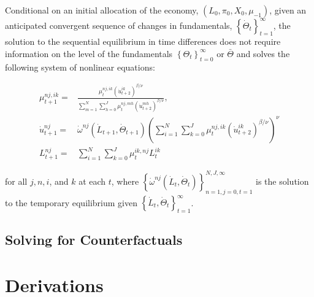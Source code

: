 \documentclass[10pt]{article}
\begin{document}
\begin{proposition} 
    Conditional on an initial allocation of the economy, 
    $\left(L_0, \pi_0, X_0, \mu_{-1}\right)$, given an anticipated 
    convergent sequence of changes in fundamentals, 
    $\left\{\dot{\Theta}_t\right\}_{t=1}^{\infty}$, the solution to the 
    sequential equilibrium in time differences does not require 
    information on the level of the fundamentals 
    $\left\{\Theta_t\right\}_{t=0}^{\infty}$ or $\bar{\Theta}$ and solves 
    the following system of nonlinear equations: 

    \begin{align}
        \mu_{t+1}^{n j, i k}=&\frac{\mu_t^{n j, i k}\left(\dot{u}_{t+2}^{i k}\right)^{\beta / \nu}}{\sum_{m=1}^N \sum_{h=0}^J \mu_t^{n j, m h}\left(\dot{u}_{t+2}^{m h}\right)^{\beta / \nu}}, \\
        \dot{u}_{t+1}^{n j}=&\dot{\omega}^{n j}\left(\dot{L}_{t+1}, \dot{\Theta}_{t+1}\right)\left(\sum_{i=1}^N \sum_{k=0}^J \mu_t^{n j, i k}\left(\dot{u}_{t+2}^{i k}\right)^{\beta / \nu}\right)^\nu \\
        L_{t+1}^{n j}=&\sum_{i=1}^N \sum_{k=0}^J \mu_t^{i k, n j} L_t^{i k}
    \end{align}

    for all $j, n, i$, and $k$ at each $t$, where $\left\{\dot{\omega}^{n j}\left(\dot{L}_t, \dot{\Theta}_t\right)\right\}_{n=1, j=0, t=1}^{N, J, \infty}$ is the solution to the temporary equilibrium given $\left\{\dot{L}_t, \dot{\Theta}_t\right\}_{t=1}^{\infty}$.

\end{proposition}

\subsection{Solving for Counterfactuals}



\section{Derivations}
\end{document}
